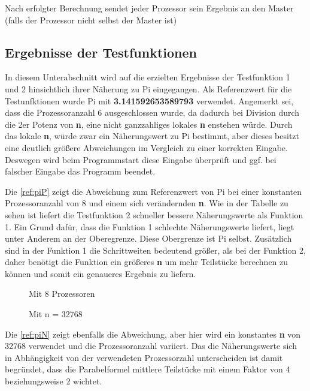 Nach erfolgter Berechnung sendet jeder Prozessor sein Ergebnis an den Master (falls der Prozessor nicht selbst der Master ist)

\subsection{Ergebnisse der Testfunktionen}
In diesem Unterabschnitt wird auf die erzielten Ergebnisse der Testfunktion 1 und 2 hinsichtlich ihrer Näherung zu Pi eingegangen.
Als Referenzwert für die Testunfktionen wurde Pi mit \textbf{3.141592653589793} verwendet.
Angemerkt sei, dass die Prozessoranzahl 6 ausgeschlossen wurde, da dadurch bei Division durch die 2er Potenz von \textbf{n}, eine nicht ganzzahliges lokales \textbf{n} enstehen würde.
Durch das lokale \textbf{n}, würde zwar ein Näherungswert zu Pi bestimmt, aber dieses besitzt eine deutlich größere Abweichungen im Vergleich zu einer korrekten Eingabe.
Deswegen wird beim Programmstart diese Eingabe überprüft und ggf. bei falscher Eingabe das Programm beendet.

Die \autoref{ref:piP} zeigt die Abweichung zum Referenzwert von Pi bei einer konstanten Prozessoranzahl von 8 und einem sich verändernden \textbf{n}.
Wie in der Tabelle zu sehen ist liefert die Testfunktion 2 schneller bessere Näherungswerte als Funktion 1.
Ein Grund dafür, dass die Funktion 1 schlechte Näherungswerte liefert, liegt unter Anderem an der Oberegrenze.
Diese Obergrenze ist Pi selbst.
Zusätzlich sind in der Funktion 1 die Schrittweiten bedeutend größer, als bei der Funktion 2, daher benötigt die Funktion ein größeres \textbf{n} um mehr Teilstücke berechnen zu können und somit ein genaueres Ergebnis zu liefern.
\begin{figure}[h]
\begin{minipage}{0.45\textwidth}
	\caption{Mit 8 Prozessoren}
	\label{ref:piP}
\end{minipage}
\hfill
\begin{minipage}{0.45\textwidth}
	\caption{Mit n = 32768}
	\label{ref:piN}
\end{minipage}
\end{figure}
Die \autoref{ref:piN} zeigt ebenfalls die Abweichung, aber hier wird ein konstantes \textbf{n} von 32768 verwendet und die Prozessoranzahl variiert.
Das die Näherungswerte sich in Abhängigkeit von der verwendeten Prozessorzahl unterscheiden ist damit begründet, dass die Parabelformel mittlere Teilstücke mit einem Faktor von 4 beziehungsweise 2 wichtet.

